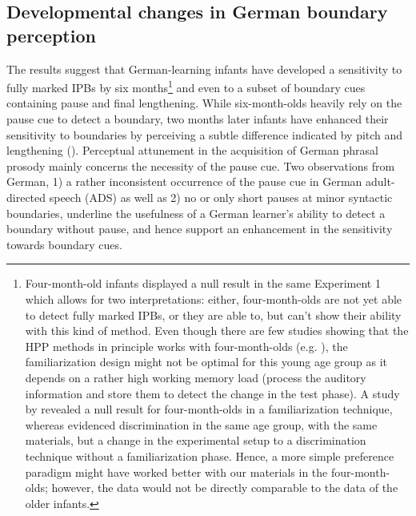 \documentclass[output=paper]{langscibook}
\begin{document}
\subsection{Developmental changes in German boundary perception}\largerpage
The results suggest that German-learning infants have developed a sensitivity to fully marked IPBs by six months\footnote{Four-month-old infants displayed a null result in the same Experiment 1 which allows for two interpretations: either, four-month-olds are not yet able to detect fully marked IPBs, or they are able to, but can’t show their ability with this kind of method. Even though there are few studies showing that the HPP methods in principle works with four-month-olds (e.g. \citealt{Bosch2001, Herold2008, Seidl2008}), the familiarization design might not be optimal for this young age group as it depends on a rather high working memory load (process the auditory information and store them to detect the change in the test phase). A study by \citet{Hohle2009} revealed a null result for four-month-olds in a familiarization technique, whereas \citet{Herold2008} evidenced discrimination in the same age group, with the same materials, but a change in the experimental setup to a discrimination technique without a familiarization phase. Hence, a more simple preference paradigm might have worked better with our materials in the four-month-olds; however, the data would not be directly comparable to the data of the older infants.}  and even to a subset of boundary cues containing pause and final lengthening. While six-month-olds heavily rely on the pause cue to detect a boundary, two months later infants have enhanced their sensitivity to boundaries by perceiving a subtle difference indicated by pitch and lengthening (\citealt{Wellmann2012}). Perceptual attunement in the acquisition of German phrasal prosody mainly concerns the necessity of the pause cue. Two observations from German, 1) a rather inconsistent occurrence of the pause cue in German adult-directed speech (ADS) as well as 2) no or only short pauses at minor syntactic boundaries, underline the usefulness of a German learner’s ability to detect a boundary without pause, and hence support an enhancement in the sensitivity towards boundary cues.
\end{document}
